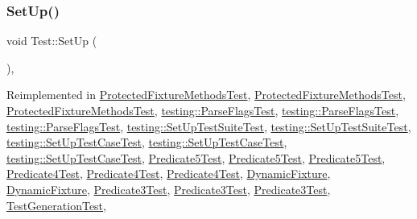 \subsubsection{\texorpdfstring{SetUp()}{SetUp()}\hspace{0.1cm}{\footnotesize\ttfamily [1/3]}}
{\footnotesize\ttfamily void Test\+::\+Set\+Up (\begin{DoxyParamCaption}{ }\end{DoxyParamCaption})\hspace{0.3cm}{\ttfamily [protected]}, {\ttfamily [virtual]}}



Reimplemented in \mbox{\hyperlink{class_protected_fixture_methods_test_a5184c708ac89cfb69f0e4c742e93398a}{Protected\+Fixture\+Methods\+Test}}, \mbox{\hyperlink{class_protected_fixture_methods_test_a9d68d51c945c3f810cc2ab76e71ecb95}{Protected\+Fixture\+Methods\+Test}}, \mbox{\hyperlink{class_protected_fixture_methods_test_a9d68d51c945c3f810cc2ab76e71ecb95}{Protected\+Fixture\+Methods\+Test}}, \mbox{\hyperlink{classtesting_1_1_parse_flags_test_a91b31cd2a108511459f49e31dcbeabe8}{testing\+::\+Parse\+Flags\+Test}}, \mbox{\hyperlink{classtesting_1_1_parse_flags_test_a91b31cd2a108511459f49e31dcbeabe8}{testing\+::\+Parse\+Flags\+Test}}, \mbox{\hyperlink{classtesting_1_1_parse_flags_test_a72fd683f0bc0c2701d9a183c6b20cb48}{testing\+::\+Parse\+Flags\+Test}}, \mbox{\hyperlink{classtesting_1_1_set_up_test_suite_test_ac01379a3be015db77866fe224807b219}{testing\+::\+Set\+Up\+Test\+Suite\+Test}}, \mbox{\hyperlink{classtesting_1_1_set_up_test_suite_test_ac01379a3be015db77866fe224807b219}{testing\+::\+Set\+Up\+Test\+Suite\+Test}}, \mbox{\hyperlink{classtesting_1_1_set_up_test_case_test_a4b44551ccf73e66de7ec95b2ab3b2085}{testing\+::\+Set\+Up\+Test\+Case\+Test}}, \mbox{\hyperlink{classtesting_1_1_set_up_test_case_test_a5ceda206e569e436d71b2084333d23b1}{testing\+::\+Set\+Up\+Test\+Case\+Test}}, \mbox{\hyperlink{classtesting_1_1_set_up_test_case_test_a5ceda206e569e436d71b2084333d23b1}{testing\+::\+Set\+Up\+Test\+Case\+Test}}, \mbox{\hyperlink{class_predicate5_test_a699fbdc25f5eeb2e810887a60a4b3c1b}{Predicate5\+Test}}, \mbox{\hyperlink{class_predicate5_test_a699fbdc25f5eeb2e810887a60a4b3c1b}{Predicate5\+Test}}, \mbox{\hyperlink{class_predicate5_test_a42bf622b4f2134d0497cd42fd2e3e1df}{Predicate5\+Test}}, \mbox{\hyperlink{class_predicate4_test_ac27e833a2c7b3f889a01ad0a5bde18c6}{Predicate4\+Test}}, \mbox{\hyperlink{class_predicate4_test_ac27e833a2c7b3f889a01ad0a5bde18c6}{Predicate4\+Test}}, \mbox{\hyperlink{class_predicate4_test_afcf9db5dc68e97291813cdfeb2aaa5d2}{Predicate4\+Test}}, \mbox{\hyperlink{class_dynamic_fixture_a1439886d8a6972815b60a216d731a115}{Dynamic\+Fixture}}, \mbox{\hyperlink{class_dynamic_fixture_a1439886d8a6972815b60a216d731a115}{Dynamic\+Fixture}}, \mbox{\hyperlink{class_predicate3_test_a4f70b241201bac1bfee5d159702188b4}{Predicate3\+Test}}, \mbox{\hyperlink{class_predicate3_test_a4f70b241201bac1bfee5d159702188b4}{Predicate3\+Test}}, \mbox{\hyperlink{class_predicate3_test_a92aad9566e0737b6739d1db14e7912be}{Predicate3\+Test}}, \mbox{\hyperlink{class_test_generation_test_a9705d633439b360b338503599a360ea8}{Test\+Generation\+Test}}, 